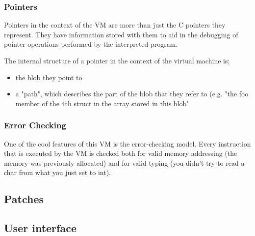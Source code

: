 \documentclass[a4paper]{report}
\begin{document}
\subsubsection{Pointers}
Pointers in the context of the VM are more than just the C pointers they represent. They have information stored with them to aid in the debugging of pointer operations performed by the interpreted program.
\par
The internal structure of a pointer in the context of the virtual machine is;
\begin{itemize}
\item the blob they point to 
\item a "path", which describes the part of the blob that they refer to (e.g. "the foo member of the 4th struct in the array stored in this blob"
\end{itemize}
\subsubsection{Error Checking}
One of the cool features of this VM is the error-checking model. Every instruction that is executed by the VM is checked both for valid memory addressing (the memory was previously allocated) and for valid typing (you didn't try to read a char from what you just set to int). 
\subsection{Patches}
\subsection{User interface}






\appendix



\end{document}
